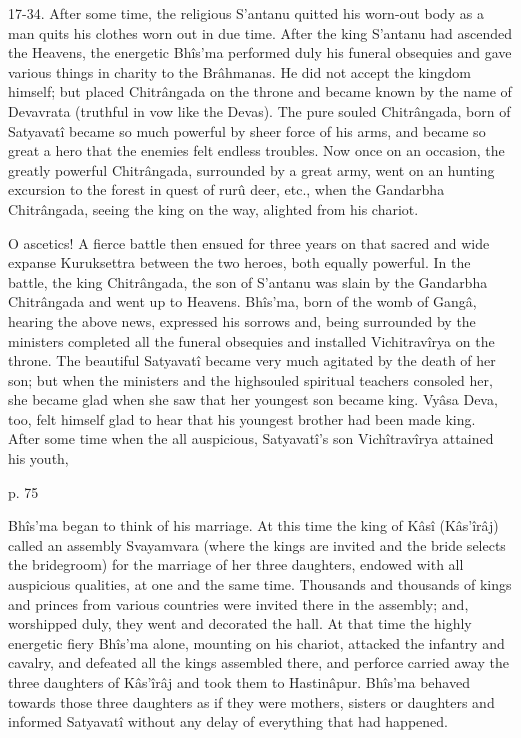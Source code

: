  

17-34. After some time, the religious S’antanu quitted his worn-out body as a man quits his clothes worn out in due time. After the king S’antanu had ascended the Heavens, the energetic Bhîs'ma performed duly his funeral obsequies and gave various things in charity to the Brâhmanas. He did not accept the kingdom himself; but placed Chitrângada on the throne and became known by the name of Devavrata (truthful in vow like the Devas). The pure souled Chitrângada, born of Satyavatî became so much powerful by sheer force of his arms, and became so great a hero that the enemies felt endless troubles. Now once on an occasion, the greatly powerful Chitrângada, surrounded by a great army, went on an hunting excursion to the forest in quest of rurû deer, etc., when the Gandarbha Chitrângada, seeing the king on the way, alighted from his chariot.

 

O ascetics! A fierce battle then ensued for three years on that sacred and wide expanse Kuruksettra between the two heroes, both equally powerful. In the battle, the king Chitrângada, the son of S’antanu was slain by the Gandarbha Chitrângada and went up to Heavens. Bhîs’ma, born of the womb of Gangâ, hearing the above news, expressed his sorrows and, being surrounded by the ministers completed all the funeral obsequies and installed Vichitravîrya on the throne. The beautiful Satyavatî became very much agitated by the death of her son; but when the ministers and the highsouled spiritual teachers consoled her, she became glad when she saw that her youngest son became king. Vyâsa  Deva, too, felt himself glad to hear that his youngest brother had been made king. After some time when the all auspicious, Satyavatî's son Vichîtravîrya attained his youth,

 

p. 75

 

Bhîs’ma began to think of his marriage. At this time the king of Kâsî (Kâs'îrâj) called an assembly Svayamvara (where the kings are invited and the bride selects the bridegroom) for the marriage of her three daughters, endowed with all auspicious qualities, at one and the same time. Thousands and thousands of kings and princes from various countries were invited there in the assembly; and, worshipped duly, they went and decorated the hall. At that time the highly energetic fiery Bhîs’ma alone, mounting on his chariot, attacked the infantry and cavalry, and defeated all the kings assembled there, and perforce carried away the three daughters of Kâs'îrâj and took them to Hastinâpur. Bhîs’ma behaved towards those three daughters as if they were mothers, sisters or daughters and informed Satyavatî without any delay of everything that had happened.

